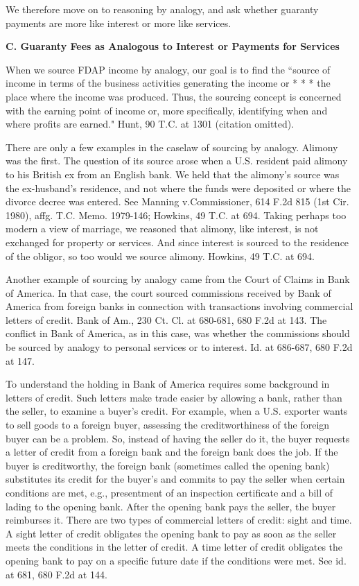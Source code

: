 \begin{select}
We therefore move on to reasoning by analogy, and ask whether guaranty payments are more like interest or more like services.

\begin{center}
	\textbf{C. Guaranty Fees as Analogous to Interest or Payments for Services}
		\end{center}

When we source FDAP income by analogy, our goal is to find the ``source of income in terms of the business activities generating the income or * * * the place where the income was produced. Thus, the sourcing concept is concerned with the earning point of income or, more specifically, identifying when and where profits are earned." Hunt, 90 T.C. at 1301 (citation omitted).

There are only a few examples in the caselaw of sourcing by analogy. Alimony was the first. The question of its source arose when a U.S. resident paid alimony to his British ex from an English bank. We held that the alimony's source was the ex-husband's residence, and not where the funds were deposited or where the divorce decree was entered. See Manning v.\@ Commissioner, 614 F.2d 815 (1st Cir. 1980), affg. T.C. Memo. 1979-146; Howkins, 49 T.C. at 694. Taking perhaps too modern a view of marriage, we reasoned that alimony, like interest, is not exchanged for property or services. And since interest is sourced to the residence of the obligor, so too would we source alimony. Howkins, 49 T.C. at 694.

Another example of sourcing by analogy came from the Court of Claims in Bank of America. In that case, the court sourced commissions received by Bank of America from foreign banks in connection with transactions involving commercial letters of credit. Bank of Am., 230 Ct. Cl. at 680-681, 680 F.2d at 143. The conflict in Bank of America, as in this case, was whether the commissions should be sourced by analogy to personal services or to interest. Id. at 686-687, 680 F.2d at 147.

To understand the holding in Bank of America requires some background in letters of credit. Such letters make trade easier by allowing a bank, rather than the seller, to examine a buyer's credit.   For example, when a U.S. exporter wants to sell goods to a foreign buyer, assessing the creditworthiness of the foreign buyer can be a problem. So, instead of having the seller do it, the buyer requests a letter of credit from a foreign bank and the foreign bank does the job. If the buyer is creditworthy, the foreign bank (sometimes called the opening bank) substitutes its credit for the buyer's and commits to pay the seller when certain conditions are met, e.g., presentment of an inspection certificate and a bill of lading to the opening bank. After the opening bank pays the seller, the buyer reimburses it. There are two types of commercial letters of credit: sight and time. A sight letter of credit obligates the opening bank to pay as soon as the seller meets the conditions in the letter of credit. A time letter of credit obligates the opening bank to pay on a specific future date if the conditions were met. See id. at 681, 680 F.2d at 144.


\end{select}
